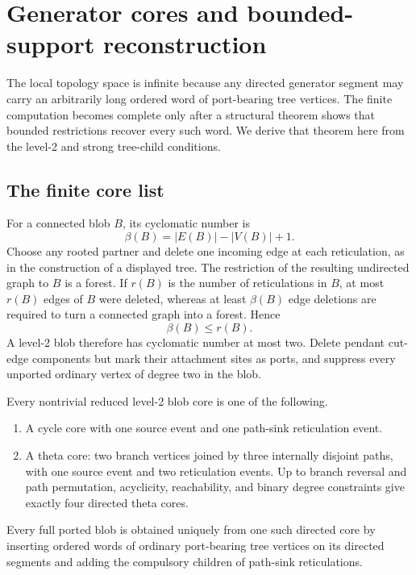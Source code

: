\section{Generator cores and bounded-support reconstruction}\label{sec:support}

The local topology space is infinite because any directed generator segment may carry an arbitrarily long ordered word of port-bearing tree vertices.  The finite computation becomes complete only after a structural theorem shows that bounded restrictions recover every such word.  We derive that theorem here from the level-2 and strong tree-child conditions.

\subsection{The finite core list}

For a connected blob $B$, its cyclomatic number is
\[
\beta(B)=|E(B)|-|V(B)|+1.
\]
Choose any rooted partner and delete one incoming edge at each reticulation, as in the construction of a displayed tree.  The restriction of the resulting undirected graph to $B$ is a forest.  If $r(B)$ is the number of reticulations in $B$, at most $r(B)$ edges of $B$ were deleted, whereas at least $\beta(B)$ edge deletions are required to turn a connected graph into a forest.  Hence
\begin{equation}\label{eq:cycle-rank-reticulation}
\beta(B)\le r(B).
\end{equation}
A level-2 blob therefore has cyclomatic number at most two.  Delete pendant cut-edge components but mark their attachment sites as ports, and suppress every unported ordinary vertex of degree two in the blob.

\begin{proposition}\label{prop:core-theorem}
Every nontrivial reduced level-2 blob core is one of the following.
\begin{enumerate}[label=\textup{(\roman*)}]
\item A cycle core with one source event and one path-sink reticulation event.
\item A theta core: two branch vertices joined by three internally disjoint paths, with one source event and two reticulation events.  Up to branch reversal and path permutation, acyclicity, reachability, and binary degree constraints give exactly four directed theta cores.
\end{enumerate}
Every full ported blob is obtained uniquely from one such directed core by inserting ordered words of ordinary port-bearing tree vertices on its directed segments and adding the compulsory children of path-sink reticulations.
\end{proposition}

